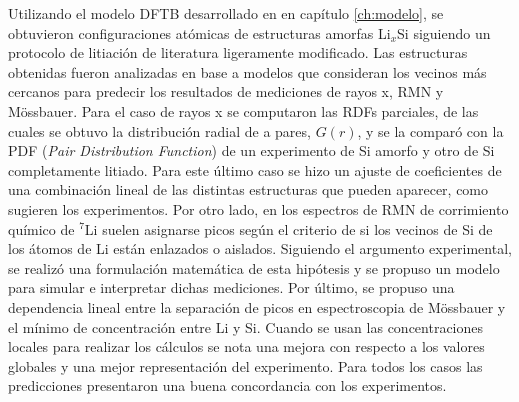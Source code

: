 Utilizando el modelo DFTB desarrollado en en capítulo \ref{ch:modelo}, se 
obtuvieron configuraciones atómicas de estructuras amorfas Li$_x$Si siguiendo un 
protocolo de litiación de literatura ligeramente modificado. Las estructuras 
obtenidas fueron analizadas en base a modelos que consideran los vecinos más 
cercanos para predecir los resultados de mediciones de rayos x, RMN y Mössbauer.
Para el caso de rayos x se computaron las RDFs parciales, de las cuales se obtuvo
la distribución radial de a pares, $G(r)$, y se la comparó con la PDF 
(\textit{Pair Distribution Function}) de un experimento de Si amorfo y otro de Si
completamente litiado. Para este último caso se hizo un ajuste de coeficientes de 
una combinación lineal de las distintas estructuras que pueden aparecer, como 
sugieren los experimentos. Por otro lado, en los espectros de RMN de corrimiento 
químico de $^7$Li suelen asignarse picos según el criterio de si los vecinos de Si de los átomos de Li están
enlazados o aislados. Siguiendo el argumento experimental, se realizó una 
formulación matemática de esta hipótesis y se propuso un modelo para simular e 
interpretar dichas mediciones. Por último, se propuso una dependencia lineal 
entre la separación de picos en espectroscopia de Mössbauer y el mínimo de 
concentración entre Li y Si. Cuando se usan las concentraciones locales para 
realizar los cálculos se nota una mejora con respecto a los valores globales y
una mejor representación del experimento. Para todos los casos las predicciones
presentaron una buena concordancia con los experimentos.
